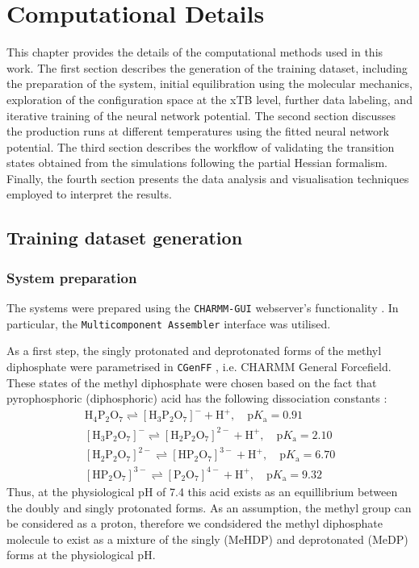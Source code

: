 \chapter{Computational Details}
This chapter provides the details of the computational methods used in this work. The first section describes the generation of the training dataset, including the preparation of the system, initial equilibration using the molecular mechanics, exploration of the configuration space at the xTB level, further data labeling, and iterative training of the neural network potential. The second section discusses the production runs at different temperatures using the fitted neural network potential. The third section describes the workflow of validating the transition states obtained from the simulations following the partial Hessian formalism. Finally, the fourth section presents the data analysis and visualisation techniques employed to interpret the results.

\section{Training dataset generation}

\subsection{System preparation}
The systems were prepared using the \texttt{CHARMM-GUI} webserver's functionality \citep{jo_charmm-gui_2008}. In particular, the \texttt{Multicomponent Assembler} interface \citep{kern_charmm-gui_2024} was utilised. 

As a first step, the singly protonated and deprotonated forms of the methyl diphosphate were parametrised in \texttt{CGenFF} \citep{kim_charmm-gui_2017}, i.e. CHARMM General Forcefield. These states of the methyl diphosphate were chosen based on the fact that pyrophosphoric (diphosphoric) acid has the following dissociation constants \citep{haynes_crc_2016}:
\begin{align*}
    \mathrm{H_4P_2O_7} \rightleftharpoons \mathrm{[H_3P_2O_7]^-} + \mathrm{H^+},\quad \mathrm{p}K_\mathrm{a} = 0.91 \\
    \mathrm{[H_3P_2O_7]^-} \rightleftharpoons \mathrm{[H_2P_2O_7]^{2-}} + \mathrm{H^+},\quad \mathrm{p}K_\mathrm{a} = 2.10 \\
    \mathrm{[H_2P_2O_7]^{2-}} \rightleftharpoons \mathrm{[HP_2O_7]^{3-}} + \mathrm{H^+},\quad \mathrm{p}K_\mathrm{a} = 6.70 \\
    \mathrm{[HP_2O_7]^{3-}} \rightleftharpoons \mathrm{[P_2O_7]^{4-}} + \mathrm{H^+},\quad \mathrm{p}K_\mathrm{a} = 9.32
\end{align*}
Thus, at the physiological pH of 7.4 this acid exists as an equillibrium between the doubly and singly protonated forms. As an assumption, the methyl group can be considered as a proton, therefore we condsidered the methyl diphosphate molecule to exist as a mixture of the singly (MeHDP) and deprotonated (MeDP) forms at the physiological pH.

